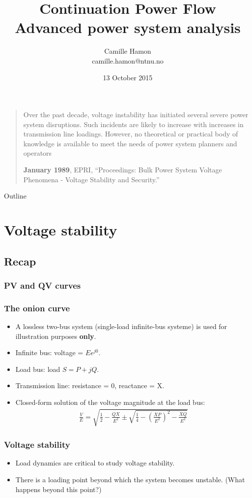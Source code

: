 \documentclass{beamer}
\title{Continuation Power Flow\\Advanced power system analysis}
\author{Camille Hamon\\camille.hamon@ntnu.no}
\date{13 October 2015}
\begin{document}
\begin{frame}[plain]
  \titlepage

\blockquote[\textbf{January 1989}, EPRI, “Proceedings: Bulk Power System Voltage Phenomena - Voltage Stability and Security.”]{Over the past decade, voltage instability has initiated several severe power system disruptions. Such incidents are likely to increase with increases in transmission line loadings. However, no theoretical or practical body of knowledge is available to meet the needs of power system planners and operators}
\end{frame}

\begin{frame}{Outline}
  \tableofcontents[subsectionstyle=hide]
\end{frame}

\section[Volt. Stab.]{Voltage stability}

\subsection{Recap}

\begin{frame}
  \frametitle{PV and QV curves}
  
\end{frame}

\begin{frame}
  \frametitle{The onion curve}
  \begin{itemize}
\item A lossless two-bus system (single-load infinite-bus systeme) is used for illustration purposes \textbf{only}.
\item Infinite bus: voltage = $Ee^{j0}$.
\item Load bus: load $S = P+jQ$.
\item Transmission line: resistance = 0, reactance = X.
\item Closed-form solution of the voltage magnitude at the load bus:
  \begin{align}
    \label{eq:11}
    \frac{V}{E} = \sqrt{\frac{1}{2}-\frac{QX}{E^2} \pm \sqrt{\frac{1}{4}-\left( \frac{XP}{E^2} \right)^2 - \frac{XQ}{E^2}}}
  \end{align}
  \end{itemize}
\end{frame}

\begin{frame}
  \frametitle{Voltage stability}
  \begin{itemize}
  \item Load dynamics are critical to study voltage stability.
  \item There is a loading point beyond which the system becomes unstable. (What happens beyond this point?)
  \end{itemize}

\end{frame}
\end{document}
